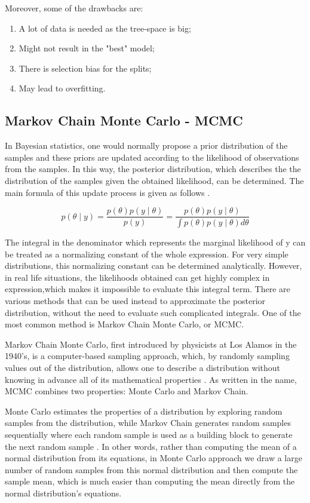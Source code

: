 \documentclass{usiinftr}
\begin{document}
Moreover, some of the drawbacks are:
\begin{enumerate}
\item A lot of data is needed as the tree-space is big;
\item Might not result in the "best" model;
\item There is selection bias for the splits;
\item May lead to overfitting.
\end{enumerate}

\subsection{Markov Chain Monte Carlo - MCMC}
In Bayesian statistics, one would normally propose a prior distribution of the samples and these priors are updated according to the likelihood of observations from the samples. In this way, the posterior distribution, which describes the the distribution of the samples given the obtained likelihood, can be determined. The main formula of this update process is given as follows \cite{21}.

\begin{equation} \label{Bayes}
p(\theta \mid y) = \frac{p(\theta)p(y \mid \theta)}{p(y)} = \frac{p(\theta)p(y \mid \theta)}{\int p(\theta)p(y \mid \theta) d\theta}
\end{equation}

The integral in the denominator which represents the marginal likelihood of y can be treated as a normalizing constant of the whole expression. For very simple distributions, this normalizing constant can be determined analytically. However, in real life situations, the likelihoods obtained can get highly complex in expression,which makes it impossible to evaluate this integral term. There are various methods that can be used instead to approximate the posterior distribution, without the need to evaluate such complicated integrals. One of the most common method is Markov Chain Monte Carlo, or MCMC.

Markov Chain Monte Carlo, first introduced by physicists at Los Alamos in the 1940's, is a computer-based sampling approach, which, by randomly sampling values out of the distribution, allows one to describe a distribution without knowing in advance all of its mathematical properties \cite{20}. As written in the name, MCMC combines two properties: Monte Carlo and Markov Chain. 

Monte Carlo estimates the properties of a distribution by exploring random samples from the distribution, while Markov Chain generates random samples sequentially where each random sample is used as a building block to generate the next random sample \cite{20}. In other words, rather than computing the mean of a normal distribution from its equations, in Monte Carlo approach we draw a large number of random samples from this normal distribution and then compute the sample mean, which is much easier than computing the mean directly from the normal distribution's equations.
\end{document}
